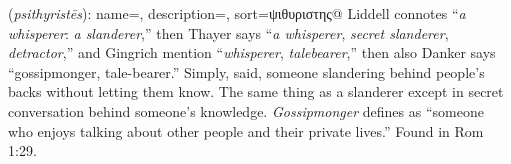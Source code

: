 \item[Gossipmonger,]

(\textit{psithyristēs}):
{
    name=,
    description={},
    sort=ψιθυριστης@
}
Liddell connotes ``\emph{a whisperer}: \emph{a slanderer},'' then Thayer says ``\emph{a whisperer}, \emph{secret slanderer}, \emph{detractor},'' and Gingrich mention ``\emph{whisperer}, \emph{talebearer},'' then also Danker says ``gossipmonger, tale-bearer.'' Simply, said, someone slandering behind people's backs without letting them know. The same thing as a slanderer except in secret conversation behind someone's knowledge. \emph{Gossipmonger} defines as ``someone who enjoys talking about other people and their private lives.''
Found in Rom 1:29.
